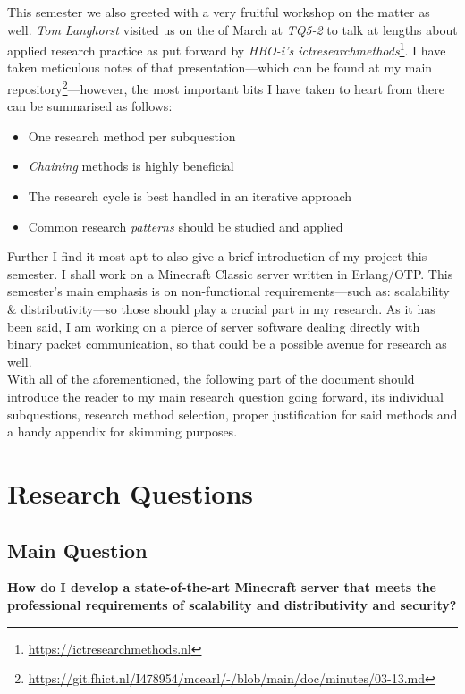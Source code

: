 \documentclass{article}
\begin{document}
    This semester we also greeted with a very fruitful workshop on the matter as well. \textit{Tom Langhorst} visited us on the  of March at \textit{TQ5-2} to talk at lengths about applied research practice as put forward by \textit{HBO-i's ictresearchmethods}\footnote{\url{https://ictresearchmethods.nl}}. I have taken meticulous notes of that presentation---which can be found at my main repository\footnote{\url{https://git.fhict.nl/I478954/mcearl/-/blob/main/doc/minutes/03-13.md}}---however, the most important bits I have taken to heart from there can be summarised as follows:
    \begin{itemize}
        \item One research method per subquestion
        \item \textit{Chaining} methods is highly beneficial
        \item The research cycle is best handled in an iterative approach
        \item Common research \textit{patterns} should be studied and applied
    \end{itemize}

    Further I find it most apt to also give a brief introduction of my project this semester. I shall work on a Minecraft Classic server written in Erlang/OTP. This semester's main emphasis is on non-functional requirements---such as: scalability \& distributivity---so those should play a crucial part in my research. As it has been said, I am working on a pierce of server software dealing directly with binary packet communication, so that could be a possible avenue for research as well. \\

    With all of the aforementioned, the following part of the document should introduce the reader to my main research question going forward, its individual subquestions, research method selection, proper justification for said methods and a handy appendix for skimming purposes.

\newpage
\section{Research Questions}
\label{section:research-questions}
    \subsection{Main Question}
    \label{section:main-question}
    \textbf{How do I develop a state-of-the-art Minecraft server that meets the professional requirements of scalability and distributivity and security?}
\end{document}
